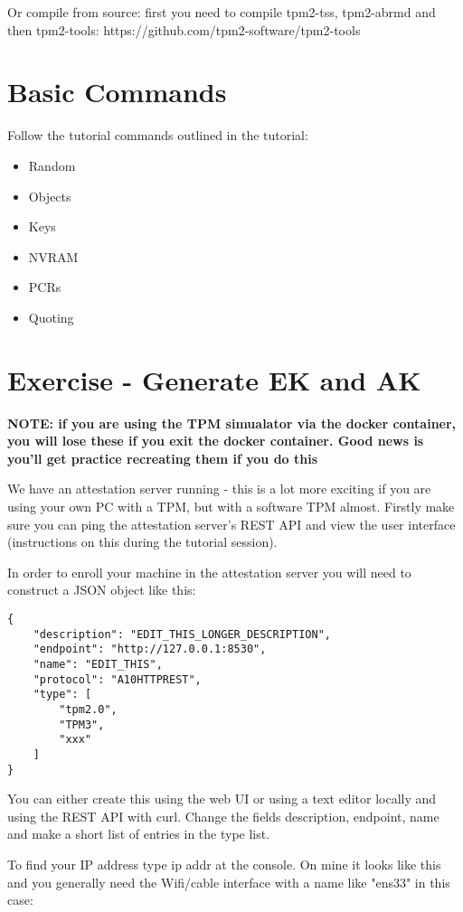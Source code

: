 \documentclass[10pt,a4paper]{article}
\begin{document}
Or compile from source: first you need to compile tpm2-tss, tpm2-abrmd and then tpm2-tools: https://github.com/tpm2-software/tpm2-tools

\section{Basic Commands}

Follow the tutorial commands outlined in the tutorial:

\begin{itemize}
 \item Random
 \item Objects
\item Keys
\item NVRAM
\item PCRs
\item Quoting
\end{itemize}

\section{Exercise - Generate EK and AK}
\textbf{NOTE: if you are using the TPM simualator via the docker container, you will lose these if you exit the docker container. Good news is you'll get practice recreating them if you do this}

We have an attestation server running - this is a lot more exciting if you are using your own PC with a TPM, but with a software TPM almost.  Firstly make sure you can ping the attestation server's REST API and view the user interface (instructions on this during the tutorial session).

In order to enroll your machine in the attestation server you will need to construct a JSON object like this:

\begin{verbatim}
{
    "description": "EDIT_THIS_LONGER_DESCRIPTION",
    "endpoint": "http://127.0.0.1:8530",
    "name": "EDIT_THIS",
    "protocol": "A10HTTPREST",
    "type": [
        "tpm2.0",
        "TPM3",
        "xxx"
    ]
}
\end{verbatim}

You can either create this using the web UI or using a text editor locally and using the REST API with curl. Change the fields description, endpoint, name and make a short list of entries in the type list.

To find your IP address type ip addr at the console. On mine it looks like this and you generally need the Wifi/cable interface with a name like "ens33" in this case:
\end{document}
